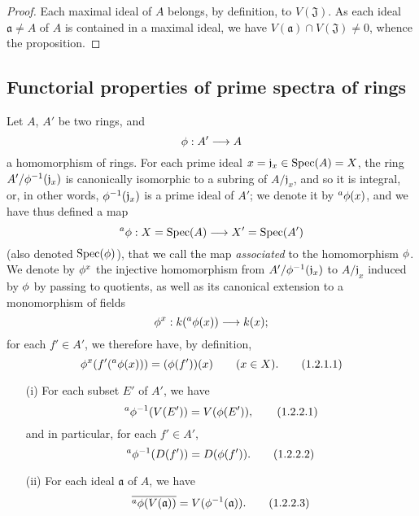 \begin{proof}
Each maximal ideal of $A$ belongs, by definition, to $V(\mathfrak{J})$.
As each ideal $\mathfrak{a}\neq A$ of $A$ is contained in a maximal ideal, we have $V(\mathfrak{a})\cap V(\mathfrak{J})\neq 0$, whence the proposition.
\end{proof}

\subsection{Functorial properties of prime spectra of rings}
\label{subsection:I.1.2}

\begin{env}[1.2.1]
\label{I.1.2.1}
Let $A$, $A'$ be two rings, and
\[
  \vphi:A'\to A
\]
a homomorphism of rings.
For each prime ideal $x=\mathfrak{j}_x\in\operatorname{Spec}(A)=X$, the ring $A'/\phi^{-1}(\mathfrak{j}_x)$ is canonically isomorphic to a subring of $A/\mathfrak{j}_x$, and so it is integral, or, in other words, $\phi^{-1}(\mathfrak{j}_x)$ is a prime ideal of $A'$;
we denote it by ${}^a\phi(x)$, and we have thus defined a map
\[
  {}^a\vphi:X=\Spec(A)\to X'=\Spec(A')
\]
(also denoted $\operatorname{Spec}(\phi)$), that we call the map \emph{associated} to the homomorphism $\phi$.
We denote by $\phi^x$ the injective homomorphism from $A'/\phi^{-1}(\mathfrak{j}_x)$ to $A/\mathfrak{j}_x$ induced by $\phi$ by passing to quotients, as well as its canonical extension to a monomorphism of fields
\[
  \vphi^x:\kres({}^a\vphi(x))\to\kres(x);
\]
\erratum[II]{}
for each $f'\in A'$, we therefore have, by definition,
\[
  \phi^x(f'({}^a\phi(x)))=(\phi(f'))(x)\qquad(x\in X).
  \tag{1.2.1.1}
\]
\end{env}

\begin{proposition}[1.2.2]
\label{I.1.2.2}
\medskip\noindent
\begin{enumerate}
  \item[{\rm(i)}] For each subset $E'$ of $A'$, we have
    \[
    \label{I.1.2.2.1}
      {}^a\phi^{-1}(V(E'))=V(\phi(E')),
      \tag{1.2.2.1}
    \]
    and in particular, for each $f'\in A'$,
    \[
    \label{I.1.2.2.2}
      {}^a\phi^{-1}(D(f'))=D(\phi(f')).
      \tag{1.2.2.2}
    \]
  \item[{\rm(ii)}] For each ideal $\mathfrak{a}$ of $A$, we have
    \[
    \label{I.1.2.2.3}
      \overline{{}^a\phi(V(\mathfrak{a}))}=V(\phi^{-1}(\mathfrak{a})).
      \tag{1.2.2.3}
    \]
\end{enumerate}
\end{proposition}

